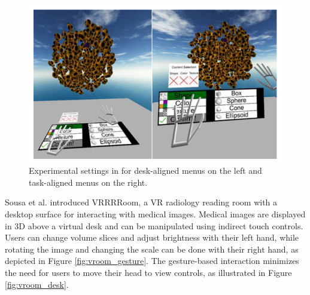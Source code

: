     \begin{figure}[h!]
        \centering
        \includegraphics[width=0.85\linewidth]{sota_desk_menu.png}
        \caption{Experimental settings in \cite{zielaskoMenusDeskSystem2019} for desk-aligned menus on the left and task-aligned menus on the right.}
        \label{fig:sota_desk_z2}
    \end{figure}

    Sousa et al. \cite{sousaVRRRRoomVirtualReality2017} introduced VRRRRoom, a VR radiology reading room with a desktop surface for interacting with medical images. Medical images are displayed in 3D above a virtual desk and can be manipulated using indirect touch controls. Users can change volume slices and adjust brightness with their left hand, while rotating the image and changing the scale can be done with their right hand, as depicted in Figure \ref{fig:vroom_gesture}. The gesture-based interaction minimizes the need for users to move their head to view controls, as illustrated in Figure \ref{fig:vroom_desk}.

